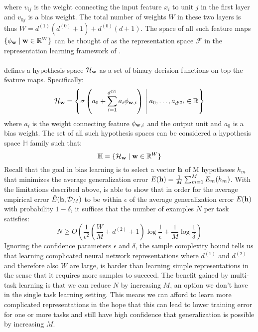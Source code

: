 where $v_{ij}$ is the weight connecting the input feature $x_i$ to unit $j$ in the first layer and $v_{0j}$ is a bias weight. The total number of weights $W$ in these two layers is thus $W = d^{(1)}(d^{(0)} + 1) + d^{(0)}(d + 1)$. The space of all such feature maps $\{\phi_{\mathbf{w}} \mid \mathbf{w} \in \mathbb{R}^W\}$ can be thought of as the representation space $\mathcal{F}$ in the representation learning framework of \citet{baxter1995}.
\\\\
\cite{baxter2000} defines a hypothesis space $\mathcal{H}_{\mathbf{w}}$ as a set of binary decision functions on top the feature maps. Specifically:
$$
\mathcal{H}_{\mathbf{w}} = \left\{ \sigma\left(  a_{0} + \sum\limits_{i=1}^{d^{(2)}} a_i\phi_{\mathbf{w},i}\right) \;\middle| \; a_{0},\dots,a_{d^{(2)}} \in \mathbb{R} \right\}
$$
where $a_i$ is the weight connecting feature $\phi_{\mathbf{w},i}$ and the output unit and $a_0$ is a bias weight. The set of all such hypothesis spaces can be considered a hypothesis space $\mathbb{H}$ family such that:
$$
\mathbb{H} = \{\mathcal{H}_{\mathbf{w}} \mid \mathbf{w} \in \mathbb{R}^W\}
$$
Recall that the goal in bias learning is to select a vector $\mathbf{h}$ of M hypotheses $h_m$ that minimizes the average generalization error $E(\mathbf{h}) = \frac{1}{M}\sum_{m=1}^M E_m(h_m)$. With the limitations described above, \citet{baxter2000} is able to show that in order for the average empirical error $\hat{E}(\mathbf{h}, \mathcal{D}_M)$ to be within $\epsilon$ of the average generalization error $E(\mathbf{h})$ with probability $1 - \delta$, it suffices that the number of examples $N$ per task satisfies:
$$
N \geq O\left( \frac{1}{\epsilon^2}\left( \frac{W}{M} + d^{(2)} + 1\right)\log \frac{1}{\epsilon} + \frac{1}{M}\log\frac{1}{\delta} \right)
$$
Ignoring the confidence parameters $\epsilon$ and $\delta$, the sample complexity bound tells us that learning complicated neural network representations where $d^{(1)}$ and $d^{(2)}$ and therefore also $W$ are large, is harder than learning simple representations in the sense that it requires more samples to succeed. The benefit gained by multi-task learning is that we can reduce $N$ by increasing $M$, an option we don't have in the single task learning setting. This means we can afford to learn more complicated representations in the hope that this can lead to lower training error for one or more tasks and still have high confidence that generalization is possible by increasing $M$.